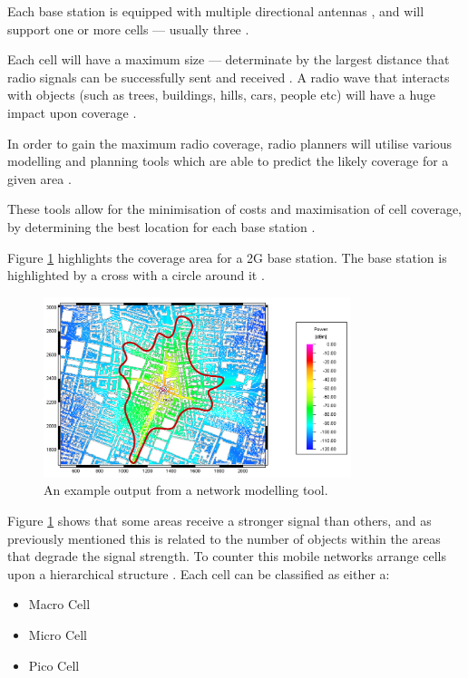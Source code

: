 Each base station is equipped with multiple directional antennas \citep{cox08}, 
and will support one or more cells –-- usually three \citep{mpirical10}.

Each cell will have a maximum size –-- determinate by the largest distance that 
radio signals can be successfully sent and received \citep{cox08}. A radio wave
that interacts with objects (such as trees, buildings, hills, cars, people etc)
will have a huge impact upon coverage \citep{mpirical10}.

In order to gain the maximum radio coverage, radio planners will utilise various 
modelling and planning tools which are able to predict the likely coverage for 
a given area \citep{mpirical10}.

These tools allow for the minimisation of costs and maximisation of cell 
coverage, by determining the best location for each base station 
\citep{mpirical10}.

Figure \ref{fig:signalStrength} highlights the coverage area for a 2G base 
station. The base station is highlighted by a cross with a circle around it
\citep{mpirical10}.

\begin{figure}[H]
  \centering
    \includegraphics[width=0.8\textwidth]{chapter3/mobile_networks/mobile_network_intensity.png}
  \caption{An example output from a network modelling tool.}
  \label{fig:signalStrength}
\end{figure}

Figure \ref{fig:signalStrength} shows that some areas receive a stronger signal
than others, and as previously mentioned this is related to the number of 
objects within the areas that degrade the signal strength. To counter this 
mobile networks arrange cells upon a hierarchical structure \citep{mpirical10}. 
Each cell can be classified as either a:
\begin{itemize}
  \item Macro Cell
  \item Micro Cell
  \item Pico Cell
\end{itemize}

